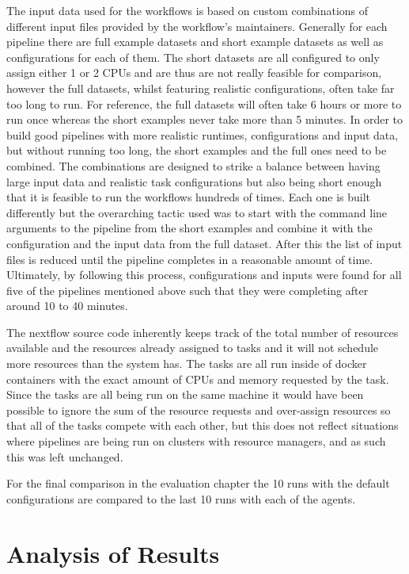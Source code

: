 The input data used for the workflows is based on custom combinations of different input files provided by the workflow's maintainers. Generally for each pipeline there are full example datasets and short example datasets as well as configurations for each of them. The short datasets are all configured to only assign either 1 or 2 CPUs and are thus are not really feasible for comparison, however the full datasets, whilst featuring realistic configurations, often take far too long to run. For reference, the full datasets will often take 6 hours or more to run once whereas the short examples never take more than 5 minutes. In order to build good pipelines with more realistic runtimes, configurations and input data, but without running too long, the short examples and the full ones need to be combined. The combinations are designed to strike a balance between having large input data and realistic task configurations but also being short enough that it is feasible to run the workflows hundreds of times. Each one is built differently but the overarching tactic used was to start with the command line arguments to the pipeline from the short examples and combine it with the configuration and the input data from the full dataset. After this the list of input files is reduced until the pipeline completes in a reasonable amount of time. Ultimately, by following this process, configurations and inputs were found for all five of the pipelines mentioned above such that they were completing after around 10 to 40 minutes.  

The nextflow source code inherently keeps track of the total number of resources available and the resources already assigned to tasks and it will not schedule more resources than the system has. The tasks are all run inside of docker containers with the exact amount of CPUs and memory requested by the task. Since the tasks are all being run on the same machine it would have been possible to ignore the sum of the resource requests and over-assign resources so that all of the tasks compete with each other, but this does not reflect situations where pipelines are being run on clusters with resource managers, and as such this was left unchanged.

For the final comparison in the evaluation chapter the 10 runs with the default configurations are compared to the last 10 runs with each of the agents.



\section{Analysis of Results}
\label{sec:analysis}

